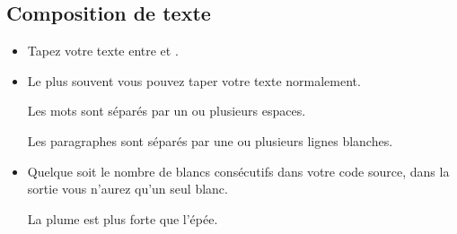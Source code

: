 \documentclass{beamer}
\begin{document}
\subsection{Composition de texte}
\begin{frame}[fragile]{\insertsubsection{}}
\small
\begin{itemize}
\item Tapez votre texte entre  et .
\item Le plus souvent vous pouvez taper votre texte normalement.
\begin{exampletwouptiny}
Les mots sont séparés par
un ou plusieurs espaces.

Les paragraphes sont séparés
par une ou plusieurs lignes blanches.
\end{exampletwouptiny}
\item Quelque soit le nombre de blancs consécutifs dans votre code source, dans la sortie vous n'aurez qu'un seul blanc.
\begin{exampletwouptiny}
La   plume       est plus forte
que l'épée.
\end{exampletwouptiny}
\end{itemize}
\end{frame}
\end{document}

